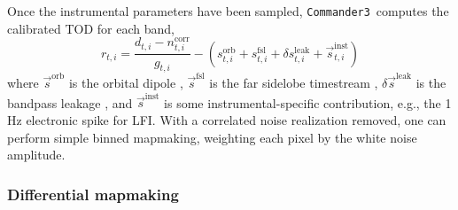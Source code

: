 \documentclass[twocolumn]{../../common/aa}
\def\commanderthree{\texttt{Commander3}}
\newcommand{\s}[0]{\vec{s}}
\begin{document}
Once the instrumental parameters have been sampled, \commanderthree\ computes the calibrated TOD for each band,
\begin{equation}
	r_{t,i}=\frac{d_{t,i}-n_{t,i}^\mathrm{corr}}{g_{t,i}}-\left(s_{t,i}^\mathrm{orb}
	+s_{t,i}^\mathrm{fsl}+\delta s_{t,i}^\mathrm{leak}+\vec{s}_{t,i}^\mathrm{inst}\right)
\end{equation}
where $\s^\mathrm{orb}$ is the orbital dipole \citep{bp07}, $\s^\mathrm{fsl}$ is the far sidelobe timestream \citep{bp08}, $\delta\s^\mathrm{leak}$ is the bandpass leakage \citep{bp09}, and $\s^\mathrm{inst}$ is some instrumental-specific contribution, e.g., the 1\,Hz electronic spike for LFI. With a correlated noise realization removed, one can perform simple binned mapmaking, weighting each pixel by the white noise amplitude.





\subsubsection{Differential mapmaking}
\label{ssec:mapmaking}
\end{document}
